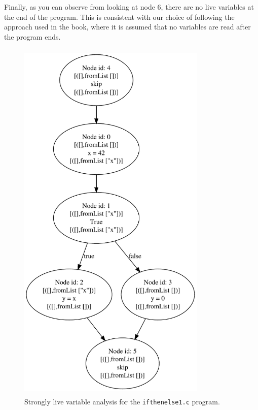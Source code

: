 \documentclass{article}
\begin{document}
Finally, as you can observe from looking at node 6, there are no live variables at the end of the program. This is consistent with our choice of following the approach used in the book, where it is assumed that no variables are read after the program ends.

\begin{figure}
	\centering
	\includegraphics[width=9cm, height=18cm]{slv_ifthenelse1}
	\caption{Strongly live variable analysis for the \texttt{ifthenelse1.c} program.}
	\label{fig-slv}
\end{figure}
\end{document}
